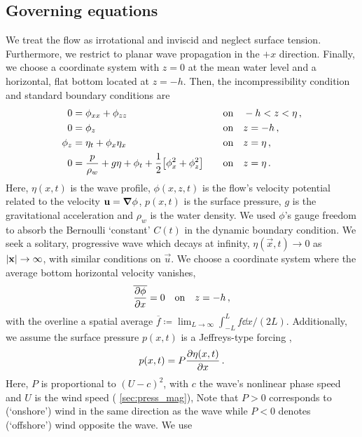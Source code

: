 \documentclass{jfm}
\begin{document}
\subsection{\label{sec:governing} Governing equations}
We treat the flow as irrotational and inviscid and neglect surface
tension.
Furthermore, we restrict to planar wave propagation in the $+x$
direction.
Finally, we choose a coordinate system with $z=0$ at the mean water
level and a horizontal, flat bottom located at $z=-h$.
Then, the incompressibility condition and standard boundary conditions
are
\begin{alignat}{2}
  0 &= \phi_{xx} + \phi_{zz} &&\qq{on}
  -h < z < \eta \,, \label{eq:laplace}\\
  0 &= \phi_{z} &&\qq{on} z=-h \,, \label{eq:bottom_bc}\\
  \phi_{z} &= \eta_{t} + \phi_{x} \eta_{x} &&\qq{on} z = \eta \,,
  \label{eq:kinematic_bc}\\
  0 &= \frac{p}{\rho_w} + g\eta + \phi_{t} +
  \frac{1}{2} \bqty{\phi_{x}^2 + \phi_{z}^2} &&\qq{on} z=
  \eta \,. \label{eq:dynamic_bc}
\end{alignat}
Here, $\eta(x,t)$ is the wave profile, $\phi(x,z,t)$ is the flow's
velocity potential related to the velocity $\mathbf{\bm{u}} = \grad{\phi}$,
$p(x,t)$ is the surface pressure, $g$ is the gravitational acceleration
and $\rho_w$ is the water density.
We used $\phi$'s gauge freedom to absorb the Bernoulli `constant'
$C(t)$ in the dynamic boundary condition.
We seek a solitary, progressive wave which decays at infinity,
$\eta(\vec{x},t) \to 0$ as $\abs{\mathbf{\bm{x}}} \to \infty$, with similar
conditions on $\vec{u}$.
We choose a coordinate system where the average bottom horizontal
velocity vanishes,
\begin{equation}
  \overline{ \pdv{\phi}{x} } = 0 \qq{on} z=-h \,,
  \label{eq:bot_bc_horz}
\end{equation}
with the overline a spatial average $\overline{f} \coloneqq
\lim_{L\to\infty} \int_{-L}^{L} f \dd{x} / (2L)$.
Additionally, we assume the surface pressure $p(x,t)$ is a Jeffreys-type
forcing \citep{jeffreys1925formation},
\begin{equation}
  p(x,t) = P \pdv{\eta(x,t)}{x} \,.
  \label{eq:press_def}
\end{equation}
Here, $P$ is proportional to $(U-c)^2$, with $c$ the wave's nonlinear
phase speed and $U$ is the wind speed (\cf{} \cref{sec:press_mag}),
Note that $P>0$ corresponds to (`onshore') wind in the same direction as
the wave while $P<0$ denotes (`offshore') wind opposite the wave. We use
\end{document}
